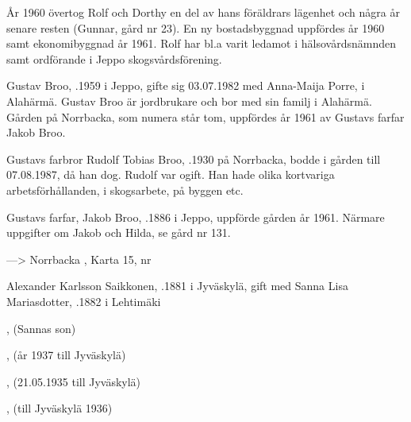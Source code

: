 År 1960 övertog Rolf och Dorthy en del av hans föräldrars lägenhet och några år senare resten (Gunnar, gård nr 23). En ny bostadsbyggnad uppfördes år 1960 samt ekonomibyggnad år 1961. Rolf har bl.a varit ledamot i hälsovårdsnämnden samt ordförande i Jeppo skogsvårdsförening.






Gustav Broo,  .1959 i Jeppo, gifte sig 03.07.1982 med Anna-Maija Porre,  i Alahärmä. Gustav Broo är jordbrukare och bor med sin familj i Alahärmä. Gården på Norrbacka, som numera står tom, uppfördes år 1961 av Gustavs farfar Jakob Broo.

\begin{jhchildren}
  \item {}
  \item {}
  \item {}
  \item {}
\end{jhchildren}


Gustavs farbror Rudolf Tobias Broo, .1930 på Norrbacka, bodde i gården till 07.08.1987, då han dog. Rudolf var ogift. Han hade olika kortvariga arbetsförhållanden, i skogsarbete, på byggen etc.


Gustavs farfar, Jakob Broo, .1886 i Jeppo, uppförde gården år 1961. Närmare uppgifter om Jakob och Hilda, se gård nr 131.


---> Norrbacka  , Karta 15, nr 


Alexander Karlsson Saikkonen, .1881 i Jyväskylä, gift med Sanna Lisa Mariasdotter, .1882 i Lehtimäki

\begin{jhchildren}
  \item {}, (Sannas son)
  \item {}
  \item {}, (år 1937 till Jyväskylä)
  \item {}
  \item {}
  \item {}, (21.05.1935 till Jyväskylä)
  \item {}, (till Jyväskylä 1936)
\end{jhchildren}

